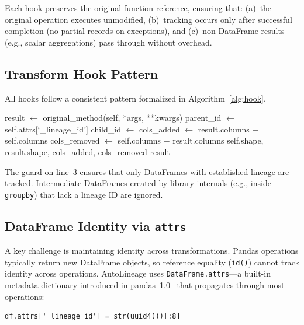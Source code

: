 \documentclass[10pt,twocolumn]{article}
\begin{document}
Each hook preserves the original function reference, ensuring that: (a)~the original operation executes unmodified, (b)~tracking occurs only after successful completion (no partial records on exceptions), and (c)~non-DataFrame results (e.g., scalar aggregations) pass through without overhead.

\subsection{Transform Hook Pattern}

All hooks follow a consistent pattern formalized in Algorithm~\ref{alg:hook}.

\begin{algorithm}[t]
\caption{Transform Hook Pattern}
\label{alg:hook}
\small
\begin{algorithmic}[1]
  \State result $\gets$ original\_method(self, *args, **kwargs)
    \State parent\_id $\gets$ self.attrs[`\_lineage\_id']
    \State child\_id $\gets$ 
    \State cols\_added $\gets$ result.columns $-$ self.columns
    \State cols\_removed $\gets$ self.columns $-$ result.columns
    \State {}
    \Statex \hspace{4em} {self.shape, result.shape, cols\_added, cols\_removed}
  \EndIf
  \State \Return result
\EndProcedure
\end{algorithmic}
\end{algorithm}

The guard on line~3 ensures that only DataFrames with established lineage are tracked. Intermediate DataFrames created by library internals (e.g., inside \texttt{groupby}) that lack a lineage ID are ignored.

\subsection{DataFrame Identity via \texttt{attrs}}

A key challenge is maintaining identity across transformations. Pandas operations typically return new DataFrame objects, so reference equality (\texttt{id()}) cannot track identity across operations. AutoLineage uses \texttt{DataFrame.attrs}---a built-in metadata dictionary introduced in pandas~1.0~\cite{mckinney2010} that propagates through most operations:

\begin{lstlisting}[numbers=none]
df.attrs['_lineage_id'] = str(uuid4())[:8]
\end{lstlisting}
\end{document}
